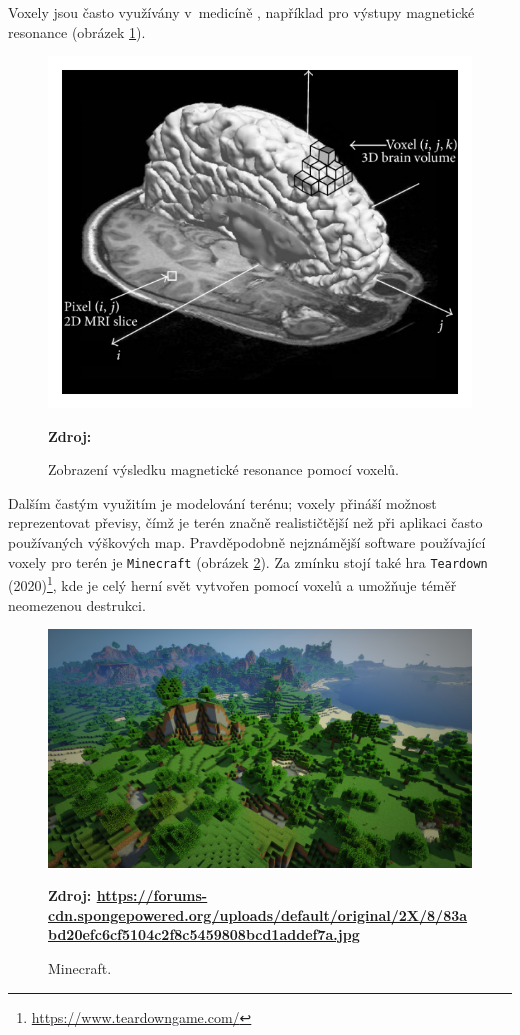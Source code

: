 Voxely jsou často využívány v~medicíně \cite{medical_vox}, například pro výstupy magnetické resonance (obrázek \ref{fig:mri_vox}).

\begin{figure}[H]
	\centering
	\includegraphics[scale=1]{obrazky-figures/voxel_mri.png}
	\caption{Zobrazení výsledku magnetické resonance pomocí voxelů.}
	\textbf{Zdroj: \cite{mri}}
	\label{fig:mri_vox}
\end{figure}

Dalším častým využitím je modelování terénu; voxely přináší možnost reprezentovat převisy, čímž je terén značně realističtější než při aplikaci často používaných výškových map. Pravděpodobně nejznámější software používající voxely pro terén je \texttt{Minecraft} (obrázek \ref{fig:minecraft}). Za zmínku stojí také hra \texttt{Teardown} (2020)\footnote{\url{https://www.teardowngame.com/}}, kde je celý herní svět vytvořen pomocí voxelů a umožňuje téměř neomezenou destrukci.

\begin{figure}[H]
	\centering
	\includegraphics[scale=0.15]{obrazky-figures/minecraft.jpg}
	\caption{Minecraft.}
	\textbf{Zdroj: \url{https://forums-cdn.spongepowered.org/uploads/default/original/2X/8/83abd20efc6cf5104c2f8c5459808bcd1addef7a.jpg}}
	\label{fig:minecraft}
\end{figure}

